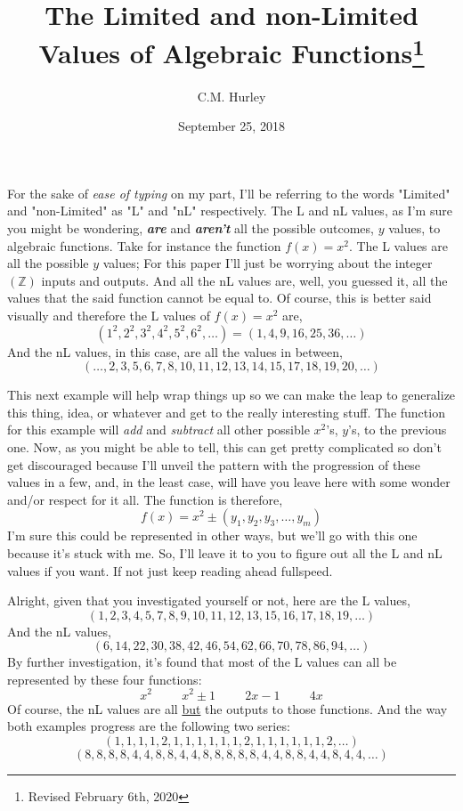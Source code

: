 \documentclass[12pt, letterpaper, twosides]{article}
\title{The Limited and non-Limited Values of Algebraic Functions\footnote{Revised February 6th, 2020}}
\author{C.M. Hurley}
\date{September 25, 2018}
\begin{document}
	\maketitle


For the sake of \textit{ease of typing} on my part, I'll be referring to the words "Limited" and "non-Limited" as "L" and "nL" respectively. The L and nL values, as I'm sure you might be wondering, \textit{\textbf{are}} and \textit{\textbf{aren't}} all the possible outcomes, $y$ values, to algebraic functions. Take for instance the function $f(x)=x^2$. The L values are all the possible $y$ values; For this paper I'll just be worrying about the integer $\mathbb{(Z)}$ inputs and outputs. And all the nL values are, well, you guessed it, all the values that the said function cannot be equal to. Of course, this is better said visually and therefore the L values of $f(x)=x^2$ are,
$$(1^2, 2^2, 3^2, 4^2, 5^2, 6^2, \dots)=(1, 4, 9, 16, 25, 36, \dots)$$
And the nL values, in this case, are all the values in between,
$$(\dots, 2, 3, 5, 6, 7, 8, 10, 11, 12, 13, 14, 15, 17, 18, 19, 20, \dots)$$

This next example will help wrap things up so we can make the leap to generalize this thing, idea, or whatever and get to the really interesting stuff. The function for this example will \textit{add} and \textit{subtract} all other possible $x^2$'s, $y$'s, to the previous one. Now, as you might be able to tell, this can get pretty complicated so don't get discouraged because I'll unveil the pattern with the progression of these values in a few, and, in the least case, will have you leave here with some wonder and/or respect for it all. The function is therefore, 
$$f(x)=x^2 \pm(y_1, y_2, y_3, \dots, y_m)$$
I'm sure this could be represented in other ways, but we'll go with this one because it's stuck with me. So, I'll leave it to you to figure out all the L and nL values if you want. If not just keep reading ahead fullspeed.

Alright, given that you investigated yourself or not, here are the L values,
$$(1, 2, 3, 4, 5, 7, 8, 9, 10, 11, 12, 13, 15, 16, 17, 18, 19, \dots)$$
And the nL values,
$$(6, 14, 22, 30, 38, 42, 46, 54, 62, 66, 70, 78, 86, 94, \dots)$$
By further investigation, it's found that most of the L values can all be represented by these four functions:
$$x^2 \hspace{1cm} x^2 \pm 1 \hspace{1cm} 2x-1 \hspace{1cm} 4x$$
Of course, the nL values are all \underline{but} the outputs to those functions. And the way both examples progress are the following two series:
$$(1, 1, 1, 1, 2, 1, 1, 1, 1, 1, 1, 2, 1, 1, 1, 1, 1, 1, 2, \dots)$$
$$(8, 8, 8, 8, 4, 4, 8, 8, 4, 4, 8, 8, 8, 8, 8, 4, 4, 8, 8, 4, 4, 8, 4, 4, \dots)$$
\end{document}
